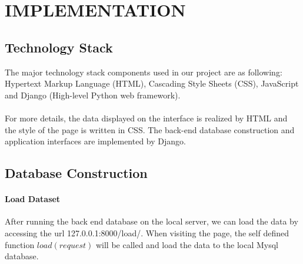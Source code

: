 \section{IMPLEMENTATION}
\label{section:implementation}

\subsection{Technology Stack}
\label{sect:sub-title}
The major technology stack components used in our project are as following: Hypertext Markup Language (HTML), Cascading Style Sheets (CSS), JavaScript and
Django (High-level Python web framework).
\\
\\
For more details, the data displayed on the interface is realized by HTML and
 the style of the page is written in CSS. The back-end database construction and application interfaces are implemented by Django.
\\
\subsection{Database Construction}
\label{sect:sub-title}
\paragraph{Load Dataset}
After running the back end database on the local server, we can load the data 
by accessing the url 127.0.0.1:8000/load/. When visiting the page, the self defined function $load(request)$ will be called and load the data to the local Mysql database.  
